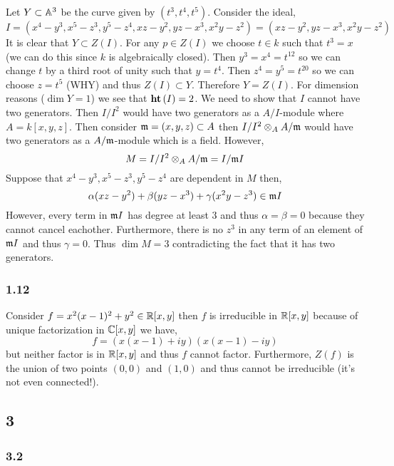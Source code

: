 \documentclass[12pt]{article}
\begin{document}
Let $Y \subset \mathbb{A}^3$ be the curve given by $(t^3, t^4, t^5)$. Consider the ideal,
\[ I = (x^4 - y^3, x^5 - z^3, y^5 - z^4, xz - y^2, yz - x^3, x^2 y - z^2) = (xz - y^2, yz - x^3, x^2 y - z^2) \]
It is clear that $Y \subset Z(I)$. For any $p \in Z(I)$ we choose $t \in k$ such that $t^3 = x$ (we can do this since $k$ is algebraically closed). Then $y^3 = x^4 = t^{12}$ so we can change $t$ by a third root of unity such that $y = t^4$. Then $z^4 = y^5 = t^{20}$ so we can choose $z = t^5$ (WHY) and thus $Z(I) \subset Y$. Therefore $Y = Z(I)$. For dimension reasons ($\dim{Y} = 1$) we see that $\mathbf{ht}\left( I \right) = 2$. We need to show that $I$ cannot have two generators. Then $I/I^2$ would have two generators as a $A/I$-module where $A = k[x,y,z]$. Then consider $\mathfrak{m} = (x,y,z) \subset A$ then $I/I^2 \otimes_A A / \mathfrak{m}$ would have two generators as a $A / \mathfrak{m}$-module which is a field. However,
\[ M = I/I^2 \otimes_A A / \mathfrak{m} = I/\mathfrak{m} I \]
Suppose that $x^4 - y^3, x^5 - z^3, y^5 - z^4$ are dependent in $M$ then,
\[ \alpha (xz - y^2) + \beta (yz - x^3) + \gamma (x^2 y - z^3) \in \mathfrak{m} I \]
However, every term in $\mathfrak{m}  I$ has degree at least $3$ and thus $\alpha = \beta = 0$ because they cannot cancel eachother. Furthermore, there is no $z^3$ in any term of an element of $\mathfrak{m} I$ and thus $\gamma = 0$. Thus $\dim{M} = 3$ contradicting the fact that it has two generators.

\subsubsection{1.12}

Consider $f = x^2(x-1)^2 + y^2 \in \mathbb{R}[x,y]$ then $f$ is irreducible in $\mathbb{R}[x,y]$ because of unique factorization in $\mathbb{C}[x,y]$ we have,
\[ f = (x(x-1) + i y)(x(x-1) - iy) \]
but neither factor is in $\mathbb{R}[x,y]$ and thus $f$ cannot factor. Furthermore, $Z(f)$ is the union of two points $(0,0)$ and $(1,0)$ and thus cannot be irreducible (it's not even connected!).  

\subsection{3}

\subsubsection{3.2}
\end{document}
